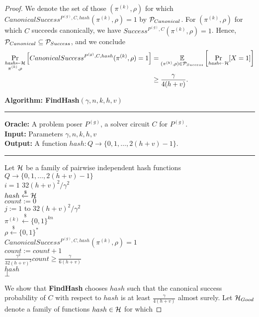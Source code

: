 \begin{proof}
We denote the set of those $(\pi^{(k)},\rho)$ for which $CanonicalSuccess^{P^{(g)}, C, hash}(\pi^{(k)}, \rho) = 1$ by $\mathcal{P}_{Canonical}$.
For $(\pi^{(k)}, \rho)$ for which $C$ succeeds canonically, we have $Success^{P^{(g)}, C}(\pi^{(k)}, \rho) = 1$.
Hence, $\mathcal{P}_{Canonical} \subseteq \mathcal{P}_{Success}$, and we conclude
\begin{align}
  \label{ineq:hash_high_prob}
\underset{\substack{\textit{hash} \leftarrow \mathcal{H} \\ \pi^{(k)}, \rho}}{\Pr}\left[CanonicalSuccess^{P^{(g)}, C, hash}(\pi^{(k)}, \rho) = 1\right] &=
\underset{{(\pi^{(k)},\rho) \in \mathcal{P}_{Success}}}{\mathbb{E}}\left[\underset{\substack{\textit{hash} \leftarrow \mathcal{H}}}{\Pr}[X = 1]\right] \notag\\
&\geq \frac{\gamma}{4(h+v)}.
\end{align}
%
\begin{codeblock}
  \textbf{Algorithm: FindHash}$(\gamma, n, k, h, v)$
  \medskip
  \hrule
  \medskip
  \textbf{Oracle:} A problem poser $P^{(g)}$, a solver circuit $C$ for $P^{(g)}$.\\
  \textbf{Input:} Parameters $\gamma, n, k, h,v $\\
  \textbf{Output:} A function $hash:Q \rightarrow \{0,1, \dots, 2(h+v)-1 \}$.
  \medskip\hrule\medskip
  Let $\mathcal{H}$ be a family of pairwise independent hash functions $Q \rightarrow \{0,1,\dots, 2(h+v)-1\}$\\
  \For $i = 1$ \To $32(h+v)^2/\gamma^2$ \Do \\
  \IndI $hash \xleftarrow{\$} \mathcal{H}$ \\
  \IndI $count := 0$ \\
  \IndI \For $j := 1$ to $32(h+v)^2/\gamma^2$ \Do \\
  \IndII $\pi^{(k)} \xleftarrow{\$} \{0,1\}^{kn} $\\
  \IndII $\rho \xleftarrow{\$} \{0,1\}^*$ \\
  \IndII \If $CanonicalSuccess^{P^{(g)}, C, hash}(\pi^{(k)}, \rho) = 1$ \then \\
  \IndIII $count := count + 1$\\
  \IndI \If $\frac{\gamma^2}{32(h+v)^2} count \geq \frac{\gamma}{6(h+v)}$ \then \\
  \IndII \return $hash$\\
  \return $\bot$
\end{codeblock}
We show that \textbf{FindHash} chooses $hash$ such that the canonical success probability of $C$
with respect to $hash$ is at least $\frac{\gamma}{4(h+v)}$ almost surely.
Let $\mathcal{H}_{Good}$ denote a family of functions $hash \in \mathcal{H}$ for which

\end{proof}
